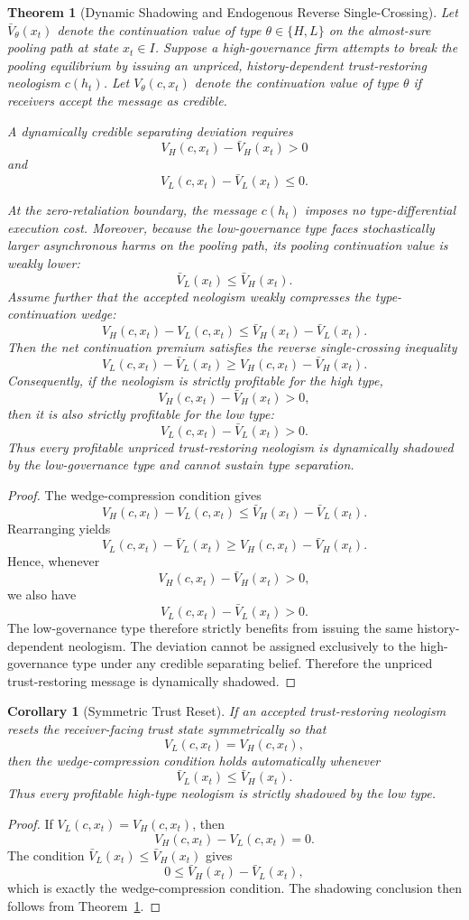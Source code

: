 \documentclass[review,authoryear]{elsarticle}
\newtheorem{theorem}{Theorem}
\newtheorem{corollary}{Corollary}
\theoremstyle{definition}
\theoremstyle{plain}
\begin{document}
\begin{theorem}[Dynamic Shadowing and Endogenous Reverse Single-Crossing]
\label{thm:dynamic-shadowing}
Let $\bar{V}_\theta(x_t)$ denote the continuation value of type
$\theta\in\{H,L\}$ on the almost-sure pooling path at state $x_t\in I$.
Suppose a high-governance firm attempts to break the pooling equilibrium by
issuing an unpriced, history-dependent trust-restoring neologism $c(h_t)$.
Let $V_\theta(c,x_t)$ denote the continuation value of type $\theta$ if
receivers accept the message as credible.

A dynamically credible separating deviation requires
\[
V_H(c,x_t)-\bar{V}_H(x_t)>0
\]
and
\[
V_L(c,x_t)-\bar{V}_L(x_t)\le 0.
\]

At the zero-retaliation boundary, the message $c(h_t)$ imposes no
type-differential execution cost.  Moreover, because the low-governance type
faces stochastically larger asynchronous harms on the pooling path, its
pooling continuation value is weakly lower:
\[
\bar{V}_L(x_t)\le \bar{V}_H(x_t).
\]
Assume further that the accepted neologism weakly compresses the
type-continuation wedge:
\[
V_H(c,x_t)-V_L(c,x_t)
\le
\bar{V}_H(x_t)-\bar{V}_L(x_t).
\]
Then the net continuation premium satisfies the reverse single-crossing
inequality
\[
V_L(c,x_t)-\bar{V}_L(x_t)
\ge
V_H(c,x_t)-\bar{V}_H(x_t).
\]
Consequently, if the neologism is strictly profitable for the high type,
\[
V_H(c,x_t)-\bar{V}_H(x_t)>0,
\]
then it is also strictly profitable for the low type:
\[
V_L(c,x_t)-\bar{V}_L(x_t)>0.
\]
Thus every profitable unpriced trust-restoring neologism is dynamically
shadowed by the low-governance type and cannot sustain type separation.
\end{theorem}
\begin{proof}
The wedge-compression condition gives
\[
V_H(c,x_t)-V_L(c,x_t)
\le
\bar{V}_H(x_t)-\bar{V}_L(x_t).
\]
Rearranging yields
\[
V_L(c,x_t)-\bar{V}_L(x_t)
\ge
V_H(c,x_t)-\bar{V}_H(x_t).
\]
Hence, whenever
\[
V_H(c,x_t)-\bar{V}_H(x_t)>0,
\]
we also have
\[
V_L(c,x_t)-\bar{V}_L(x_t)>0.
\]
The low-governance type therefore strictly benefits from issuing the same
history-dependent neologism. The deviation cannot be assigned exclusively to
the high-governance type under any credible separating belief. Therefore the
unpriced trust-restoring message is dynamically shadowed.
\end{proof}

\begin{corollary}[Symmetric Trust Reset]
\label{cor:symmetric-trust-reset}
If an accepted trust-restoring neologism resets the receiver-facing trust state
symmetrically so that
\[
V_L(c,x_t)=V_H(c,x_t),
\]
then the wedge-compression condition holds automatically whenever
\[
\bar{V}_L(x_t)\le \bar{V}_H(x_t).
\]
Thus every profitable high-type neologism is strictly shadowed by the low type.
\end{corollary}
\begin{proof}
If $V_L(c,x_t)=V_H(c,x_t)$, then
\[
V_H(c,x_t)-V_L(c,x_t)=0.
\]
The condition $\bar{V}_L(x_t)\le \bar{V}_H(x_t)$ gives
\[
0\le \bar{V}_H(x_t)-\bar{V}_L(x_t),
\]
which is exactly the wedge-compression condition.  The shadowing conclusion
then follows from Theorem~\ref{thm:dynamic-shadowing}.
\end{proof}
\end{document}

